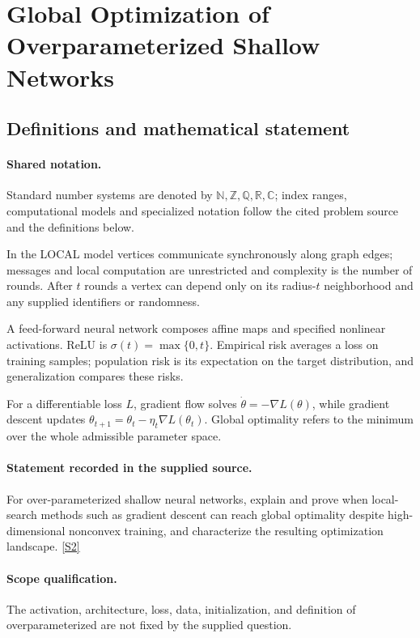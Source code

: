 \documentclass[11pt]{article}
\newcommand{\sref}[2]{\hyperlink{source:#1:#2}{[S#2]}}
\begin{document}
\section{Global Optimization of Overparameterized Shallow Networks}\label{statement}

\subsection{Definitions and mathematical statement}

\paragraph{Shared notation.}Standard number systems are denoted by $\mathbb N,\mathbb Z,\mathbb Q,\mathbb R,\mathbb C$; index ranges, computational models and specialized notation follow the cited problem source and the definitions below.


In the LOCAL model vertices communicate synchronously along graph edges; messages and local computation are unrestricted and complexity is the number of rounds. After $t$ rounds a vertex can depend only on its radius-$t$ neighborhood and any supplied identifiers or randomness.

A feed-forward neural network composes affine maps and specified nonlinear activations. ReLU is $\sigma(t)=\max\{0,t\}$. Empirical risk averages a loss on training samples; population risk is its expectation on the target distribution, and generalization compares these risks.

For a differentiable loss $L$, gradient flow solves $\dot\theta=-\nabla L(\theta)$, while gradient descent updates $\theta_{t+1}=\theta_t-\eta_t\nabla L(\theta_t)$. Global optimality refers to the minimum over the whole admissible parameter space.
\paragraph{Statement recorded in the supplied source.}
For over-parameterized shallow neural networks, explain and prove when local-search methods such as gradient descent can reach global optimality despite high-dimensional nonconvex training, and characterize the resulting optimization landscape. \sref{statement}{2}
\paragraph{Scope qualification.}
The activation, architecture, loss, data, initialization, and definition of overparameterized are not fixed by the supplied question.
\end{document}
